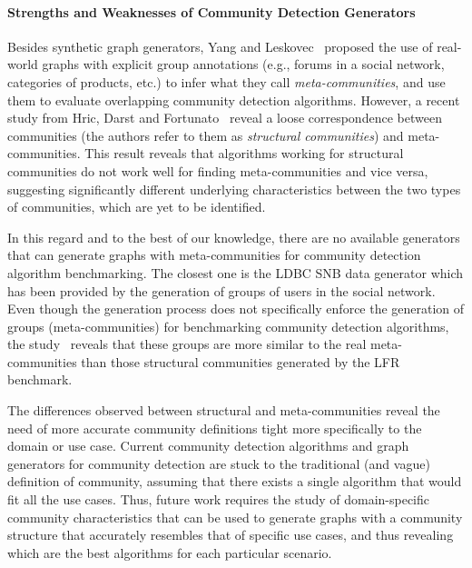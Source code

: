 \paragraph{Strengths and Weaknesses of Community Detection Generators}
Besides synthetic graph generators, Yang and Leskovec~\cite{yang2015defining}
proposed the use of real-world graphs with explicit group annotations (e.g.,
forums in a social network, categories of products, etc.) to infer what they
call \emph{meta-communities}, and use them to evaluate overlapping community
detection algorithms. However, a recent study from Hric, Darst and
Fortunato~\cite{hric2014community} reveal a loose correspondence between
communities (the authors refer to them as \emph{structural communities}) and
meta-communities.  This result reveals that  algorithms working for structural
communities do not work well for finding meta-communities and vice versa,
suggesting significantly different underlying characteristics
between the two types of communities, which are yet to be
identified.

In this regard and to the best of our knowledge, there are no available
generators that can generate graphs with meta-communities for community detection
algorithm benchmarking. The closest one is the LDBC SNB data
generator which has been provided by the
generation of groups of users in the social network. Even though the generation
process does not specifically enforce the generation of groups
(meta-communities) for benchmarking community detection algorithms, the study~\cite{Prat-Perez:2014:CSS:2621934.2621942} reveals that these groups are more similar
to the real meta-communities than those structural communities generated by the
LFR benchmark.

The differences observed between structural and meta-communities reveal the need
of more accurate community definitions tight more specifically to the domain or
use case. Current community detection algorithms and graph generators for
community detection are stuck to the traditional (and vague) definition of
community, assuming that there exists a single algorithm that would fit all the
use cases. Thus, future work requires the study of domain-specific community
characteristics that can be used to generate graphs with a community structure
that accurately resembles that of specific use cases, and thus revealing which
are the best algorithms for each particular scenario.

